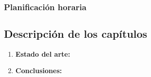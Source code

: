 % 

\subsubsection{Planificación horaria}
\label{subsubsec:hores}

\subsection{Descripción de los capítulos}
\label{subsec:chaps}


\begin{enumerate}
    \item \textbf{Estado del arte: } 
    \item \textbf{Conclusiones: } 
\end{enumerate}
\clearpage
